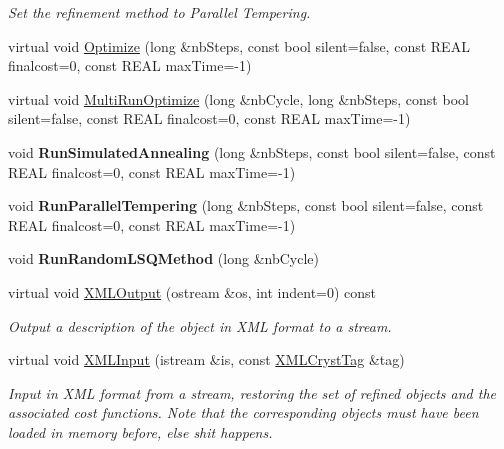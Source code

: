 \begin{DoxyCompactItemize}
\begin{DoxyCompactList}\small\item\em Set the refinement method to Parallel Tempering. \end{DoxyCompactList}\item 
virtual void \mbox{\hyperlink{class_obj_cryst_1_1_monte_carlo_obj_ad036c6dbffb9a65ae1a7545418f16c73}{Optimize}} (long \&nb\+Steps, const bool silent=false, const R\+E\+AL finalcost=0, const R\+E\+AL max\+Time=-\/1)
\item 
virtual void \mbox{\hyperlink{class_obj_cryst_1_1_monte_carlo_obj_a86a5e1222f1a836da730f7d17b752021}{Multi\+Run\+Optimize}} (long \&nb\+Cycle, long \&nb\+Steps, const bool silent=false, const R\+E\+AL finalcost=0, const R\+E\+AL max\+Time=-\/1)
\item 
\mbox{\label{class_obj_cryst_1_1_monte_carlo_obj_a80c15a8ba385e2e0f3e8a52451898fde}} 
void {\bfseries Run\+Simulated\+Annealing} (long \&nb\+Steps, const bool silent=false, const R\+E\+AL finalcost=0, const R\+E\+AL max\+Time=-\/1)
\item 
\mbox{\label{class_obj_cryst_1_1_monte_carlo_obj_a707045b814adb938fa5a1d8485074d21}} 
void {\bfseries Run\+Parallel\+Tempering} (long \&nb\+Steps, const bool silent=false, const R\+E\+AL finalcost=0, const R\+E\+AL max\+Time=-\/1)
\item 
\mbox{\label{class_obj_cryst_1_1_monte_carlo_obj_aaac316fdf4bd4ffb7b3d0b28586a7c71}} 
void {\bfseries Run\+Random\+L\+S\+Q\+Method} (long \&nb\+Cycle)
\item 
virtual void \mbox{\hyperlink{class_obj_cryst_1_1_monte_carlo_obj_a540de9354fcb298fca0458f041238f6e}{X\+M\+L\+Output}} (ostream \&os, int indent=0) const
\begin{DoxyCompactList}\small\item\em Output a description of the object in X\+ML format to a stream. \end{DoxyCompactList}\item 
virtual void \mbox{\hyperlink{class_obj_cryst_1_1_monte_carlo_obj_a1b8be4dded36d1d2f882674decc5649c}{X\+M\+L\+Input}} (istream \&is, const \mbox{\hyperlink{class_obj_cryst_1_1_x_m_l_cryst_tag}{X\+M\+L\+Cryst\+Tag}} \&tag)
\begin{DoxyCompactList}\small\item\em Input in X\+ML format from a stream, restoring the set of refined objects and the associated cost functions. Note that the corresponding objects must have been loaded in memory before, else shit happens. \end{DoxyCompactList}\item 

\end{DoxyCompactItemize}
